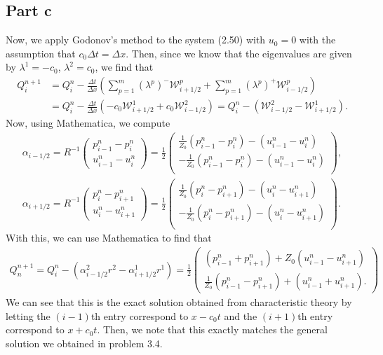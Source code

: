 \documentclass{article}
\begin{document}
\subsection{Part c}
Now, we apply Godonov's method to the system (2.50) with $u_0=0$ with the assumption that $c_0\Delta t=\Delta x$. Then, since we know that the eigenvalues are given by $\lambda^1=-c_0$, $\lambda^2=c_0$, we find that 
\begin{align*}
Q^{n+1}_i&=Q^n_i-\frac{\Delta t}{\Delta x}\left(\sum_{p=1}^m(\lambda^p)^-\mathcal W^p_{i+1/2}+\sum_{p=1}^m(\lambda^p)^+\mathcal W^p_{i-1/2}\right)\\&=
Q^n_i-\frac{\Delta t}{\Delta x}\left(-c_0\mathcal W^1_{i+1/2}+c_0\mathcal W^2_{i-1/2}\right)=Q^n_i-\left( \mathcal W^2_{i-1/2}-\mathcal W^1_{i+1/2}\right).
\end{align*}
Now, using Mathematica, we compute
\begin{align*}
\alpha_{i-1/2}=R^{-1}\begin{pmatrix}
	p^n_{i-1}-p^n_{i}\\
	u^n_{i-1}-u^n_{i}
\end{pmatrix}=\frac{1}{2}\begin{pmatrix}
\frac{1}{Z_0}(p_{i-1}^n-p_i^n)-(u_{i-1}^n-u_i^n)\\
-\frac{1}{Z_0}(p_{i-1}^n-p_i^n)-(u_{i-1}^n-u_i^n)\\
\end{pmatrix},\\
\alpha_{i+1/2}=R^{-1}\begin{pmatrix}
	p^n_{i}-p^n_{i+1}\\
	u^n_{i}-u^n_{i+1}
\end{pmatrix}=\frac{1}{2}\begin{pmatrix}
	\frac{1}{Z_0}(p_{i}^n-p_{i+1}^n)-(u_{i}^n-u_{i+1}^n)\\
	-\frac{1}{Z_0}(p_{i}^n-p_{i+1}^n)-(u_{i}^n-u_{i+1}^n)\\
\end{pmatrix}.
\end{align*}
With this, we can use Mathematica to find that 
\begin{align*}
Q^{n+1}_n=Q^n_i-\left(\alpha^2_{i-1/2}r^2-\alpha^1_{i+1/2}r^1\right)=\frac{1}{2}\begin{pmatrix}
(p^n_{i-1}+p^n_{i+1})+Z_0(u^n_{i-1}-u^n_{i+1})\\\frac{1}{Z_0}(p^n_{i-1}-p^n_{i+1})+(u^n_{i-1}+u^n_{i+1}).
\end{pmatrix}
\end{align*}
We can see that this is the exact solution obtained from characteristic theory by letting the $(i-1)$th entry correspond to $x-c_0t$ and the $(i+1)$th entry correspond to $x+c_0t$. Then, we note that this exactly matches the general solution we obtained in problem 3.4.
\end{document}
